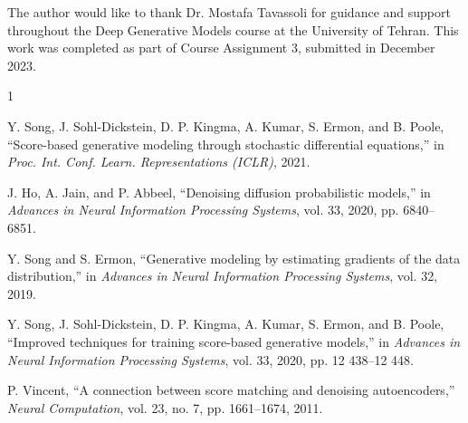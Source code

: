 \documentclass[journal]{IEEEtran}
\begin{document}
The author would like to thank Dr. Mostafa Tavassoli for guidance and support throughout the Deep Generative Models course at the University of Tehran. This work was completed as part of Course Assignment 3, submitted in December 2023.

\begin{thebibliography}{1}

Y. Song, J. Sohl-Dickstein, D. P. Kingma, A. Kumar, S. Ermon, and B. Poole, ``Score-based generative modeling through stochastic differential equations,'' in \textit{Proc. Int. Conf. Learn. Representations (ICLR)}, 2021.

J. Ho, A. Jain, and P. Abbeel, ``Denoising diffusion probabilistic models,'' in \textit{Advances in Neural Information Processing Systems}, vol. 33, 2020, pp. 6840--6851.

Y. Song and S. Ermon, ``Generative modeling by estimating gradients of the data distribution,'' in \textit{Advances in Neural Information Processing Systems}, vol. 32, 2019.

Y. Song, J. Sohl-Dickstein, D. P. Kingma, A. Kumar, S. Ermon, and B. Poole, ``Improved techniques for training score-based generative models,'' in \textit{Advances in Neural Information Processing Systems}, vol. 33, 2020, pp. 12 438--12 448.

P. Vincent, ``A connection between score matching and denoising autoencoders,'' \textit{Neural Computation}, vol. 23, no. 7, pp. 1661--1674, 2011.

\end{thebibliography}
\end{document}
